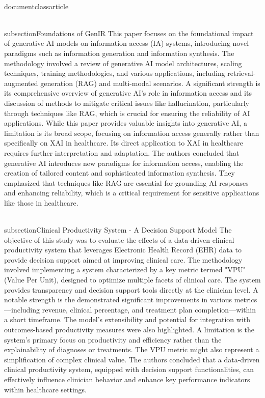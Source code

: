 \\documentclass{article}
\begin{document}
\\subsection{Foundations of GenIR}
This paper focuses on the foundational impact of generative AI models on information access (IA) systems, introducing novel paradigms such as information generation and information synthesis. The methodology involved a review of generative AI model architectures, scaling techniques, training methodologies, and various applications, including retrieval-augmented generation (RAG) and multi-modal scenarios. A significant strength is its comprehensive overview of generative AI's role in information access and its discussion of methods to mitigate critical issues like hallucination, particularly through techniques like RAG, which is crucial for ensuring the reliability of AI applications. While this paper provides valuable insights into generative AI, a limitation is its broad scope, focusing on information access generally rather than specifically on XAI in healthcare. Its direct application to XAI in healthcare requires further interpretation and adaptation. The authors concluded that generative AI introduces new paradigms for information access, enabling the creation of tailored content and sophisticated information synthesis. They emphasized that techniques like RAG are essential for grounding AI responses and enhancing reliability, which is a critical requirement for sensitive applications like those in healthcare.

\\subsection{Clinical Productivity System - A Decision Support Model}
The objective of this study was to evaluate the effects of a data-driven clinical productivity system that leverages Electronic Health Record (EHR) data to provide decision support aimed at improving clinical care. The methodology involved implementing a system characterized by a key metric termed "VPU" (Value Per Unit), designed to optimize multiple facets of clinical care. The system provides transparency and decision support tools directly at the clinician level. A notable strength is the demonstrated significant improvements in various metrics—including revenue, clinical percentage, and treatment plan completion—within a short timeframe. The model's extensibility and potential for integration with outcomes-based productivity measures were also highlighted. A limitation is the system's primary focus on productivity and efficiency rather than the explainability of diagnoses or treatments. The VPU metric might also represent a simplification of complex clinical value. The authors concluded that a data-driven clinical productivity system, equipped with decision support functionalities, can effectively influence clinician behavior and enhance key performance indicators within healthcare settings.
\end{document}
